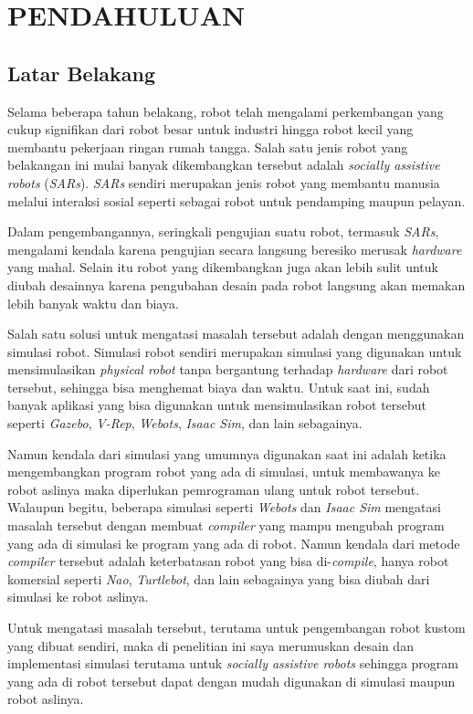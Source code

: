 \section{PENDAHULUAN}

\subsection{Latar Belakang}

Selama beberapa tahun belakang, robot telah mengalami perkembangan yang cukup signifikan dari robot besar untuk industri hingga robot kecil yang membantu pekerjaan ringan rumah tangga.
Salah satu jenis robot yang belakangan ini mulai banyak dikembangkan tersebut adalah \emph{socially assistive robots} (\emph{SARs}).
\emph{SARs} sendiri merupakan jenis robot yang membantu manusia melalui interaksi sosial seperti sebagai robot untuk pendamping maupun pelayan.

Dalam pengembangannya, seringkali pengujian suatu robot, termasuk \emph{SARs}, mengalami kendala karena pengujian secara langsung beresiko merusak \emph{hardware} yang mahal.
Selain itu robot yang dikembangkan juga akan lebih sulit untuk diubah desainnya karena pengubahan desain pada robot langsung akan memakan lebih banyak waktu dan biaya.

Salah satu solusi untuk mengatasi masalah tersebut adalah dengan menggunakan simulasi robot.
Simulasi robot sendiri merupakan simulasi yang digunakan untuk mensimulasikan \emph{physical robot} tanpa bergantung terhadap \emph{hardware} dari robot tersebut, sehingga bisa menghemat biaya dan waktu.
Untuk saat ini, sudah banyak aplikasi yang bisa digunakan untuk mensimulasikan robot tersebut seperti \emph{Gazebo}, \emph{V-Rep}, \emph{Webots}, \emph{Isaac Sim}, dan lain sebagainya.

Namun kendala dari simulasi yang umumnya digunakan saat ini adalah ketika mengembangkan program robot yang ada di simulasi, untuk membawanya ke robot aslinya maka diperlukan pemrograman ulang untuk robot tersebut.
Walaupun begitu, beberapa simulasi seperti \emph{Webots} dan \emph{Isaac Sim} mengatasi masalah tersebut dengan membuat \emph{compiler} yang mampu mengubah program yang ada di simulasi ke program yang ada di robot.
Namun kendala dari metode \emph{compiler} tersebut adalah keterbatasan robot yang bisa di-\emph{compile}, hanya robot komersial seperti \emph{Nao}, \emph{Turtlebot}, dan lain sebagainya yang bisa diubah dari simulasi ke robot aslinya.

Untuk mengatasi masalah tersebut, terutama untuk pengembangan robot kustom yang dibuat sendiri, maka di penelitian ini saya merumuskan desain dan implementasi simulasi terutama untuk \emph{socially assistive robots} sehingga program yang ada di robot tersebut dapat dengan mudah digunakan di simulasi maupun robot aslinya.

